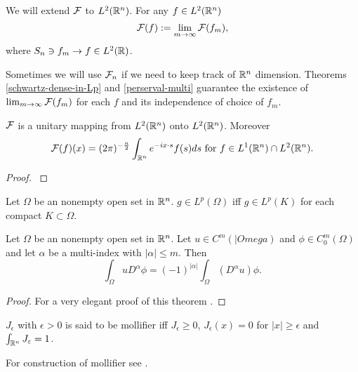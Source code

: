 \documentclass[main.tex]{subfiles}
\begin{document}
\begin{definition}
\label{extended_fourier}
We will extend $\mathcal{F}$ to $L^2(\mathbb{R}^n)$. For any $f\in L^2(\mathbb{R}^n)$
\begin{equation}
\mathcal{F}(f) := \lim_{m\to\infty} \mathcal{F}(f_m),
\end{equation}
where $S_n\ni f_m\to f\in L^2(\mathbb{R})$.
\end{definition}
Sometimes we will use $\mathcal{F}_n$ if we need to keep track of $\mathbb{R}^n$ dimension. 
Theorems \ref{schwartz-dense-in-Lp} and \ref{perserval-multi} guarantee the existence of $\lim_{m\to\infty} \mathcal{F}(f_m)$ for each $f$ and its independence of choice of $f_m$.
\begin{theorem}
$\mathcal{F}$ is a unitary mapping from $L^2(\mathbb{R}^n)$ onto $L^2(\mathbb{R}^n)$. Moreover
\begin{equation}
\mathcal{F}(f)(x) = (2\pi)^{-\frac{n}{2}}\int_{\mathbb{R}^n} e^{-ix\cdot s}f(s)ds \text{ for } f\in L^1(\mathbb{R}^n)\cap L^2(\mathbb{R}^n).
\end{equation}
\end{theorem}
\begin{proof}
\cite[see][3.2 Fourier Transform]{miklavcic1998}
\end{proof}
\begin{definition}
Let $\Omega$ be an nonempty open set in $\mathbb{R}^n$.
$g\in L^p(\Omega)$ iff $g\in L^p(K)$ for each compact $K\subset\Omega$.
\end{definition}
\begin{theorem}
Let $\Omega$ be an nonempty open set in $\mathbb{R}^n$. Let $u\in C^m(|Omega)$ and $\phi\in C_0^{m}(\Omega)$ and let $\alpha$ be a multi-index with $|\alpha| \leq m$. Then
\begin{equation}
\int_{\Omega}uD^\alpha\phi = (-1)^{|\alpha|} \int_{\Omega}(D^\alpha u)\phi.
\end{equation} 
\end{theorem}
\begin{proof}
For a very elegant proof of this theorem \cite[see][2.4]{miklavcic1998}. 
\end{proof}

\begin{definition}
$J_\epsilon$ with $\epsilon > 0$ is said to be mollifier iff $J_\epsilon \geq 0$, $J_\epsilon(x) = 0$ for $|x|\geq \epsilon$ and $\int_{\mathbb{R}^n} J_\varepsilon = 1$.
\end{definition}
For construction of mollifier see \cite[3.1]{miklavcic1998}.
\end{document}

